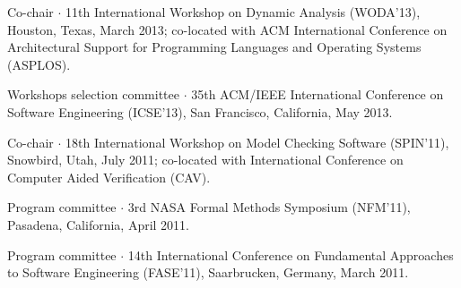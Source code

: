 \documentclass[ComputerScience]{vita}
\begin{document}
\begin{vita}
\begin{Panel and Committee Service}
\item Co-chair $\cdot$ 11th International Workshop on Dynamic Analysis (WODA'13), Houston, Texas, March 2013; co-located with ACM International Conference on Architectural Support for Programming Languages and Operating Systems (ASPLOS).
\item Workshops selection committee $\cdot$ 35th ACM/IEEE International Conference on Software Engineering (ICSE'13), San Francisco, California, May 2013.
\item Co-chair $\cdot$ 18th International Workshop on Model Checking Software (SPIN'11), Snowbird, Utah, July 2011; co-located with International Conference on Computer Aided Verification (CAV).
\item Program committee $\cdot$ 3rd NASA Formal Methods Symposium (NFM'11), Pasadena, California, April 2011. 
\item Program committee $\cdot$ 14th International Conference on Fundamental Approaches to Software Engineering (FASE'11), Saarbrucken, Germany, March 2011.

\end{Panel and Committee Service}
\end{vita}
\end{document}
